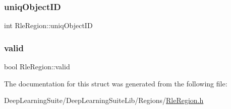 \subsubsection{\texorpdfstring{uniq\+Object\+ID}{uniqObjectID}}
{\footnotesize\ttfamily int Rle\+Region\+::uniq\+Object\+ID}

\mbox{\label{struct_rle_region_aae3c2c209a051392c0ae50b9de5dc838}} 
\subsubsection{\texorpdfstring{valid}{valid}}
{\footnotesize\ttfamily bool Rle\+Region\+::valid}



The documentation for this struct was generated from the following file\+:\begin{DoxyCompactItemize}
\item 
Deep\+Learning\+Suite/\+Deep\+Learning\+Suite\+Lib/\+Regions/\hyperlink{_rle_region_8h}{Rle\+Region.\+h}\end{DoxyCompactItemize}
